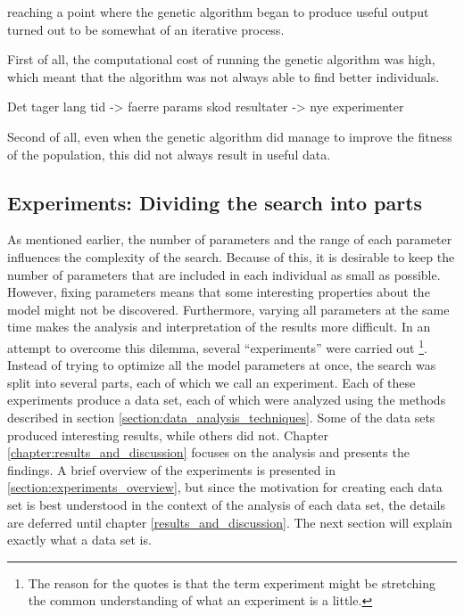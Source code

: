reaching a point where the genetic algorithm began to produce useful output turned out to be somewhat of an iterative process. 


First of all, the computational cost of running the genetic algorithm was high, which meant that the algorithm was not always able to find better individuals. 

Det tager lang tid -> faerre params
skod resultater -> nye experimenter


Second of all, even when the genetic algorithm did manage to improve the fitness of the population, this did not always result in useful data. 

\subsection{Experiments: Dividing the search into parts}\label{section:datasets_introduction}
As mentioned earlier, the number of parameters and the range of each parameter influences the complexity of the search. Because of this, it is desirable to keep the number of parameters that are included in each individual as small as possible. However, fixing parameters means that some interesting properties about the model might not be discovered. Furthermore, varying all parameters at the same time makes the analysis and interpretation of the results more difficult. In an attempt to overcome this dilemma, several ``experiments'' were carried out \footnote{The reason for the quotes is that the term experiment might be stretching the common understanding of what an experiment is a little.}. Instead of trying to optimize all the model parameters at once, the search was split into several parts, each of which we call an experiment. Each of these experiments produce a data set, each of which were analyzed using the methods described in section \ref{section:data_analysis_techniques}. Some of the data sets produced interesting results, while others did not. Chapter \ref{chapter:results_and_discussion} focuses on the analysis and presents the findings. A brief overview of the experiments is presented in \ref{section:experiments_overview}, but since the motivation for creating each data set is best understood in the context of the analysis of each data set, the details are deferred until chapter \ref{results_and_discussion}. The next section will explain exactly what a data set is.

